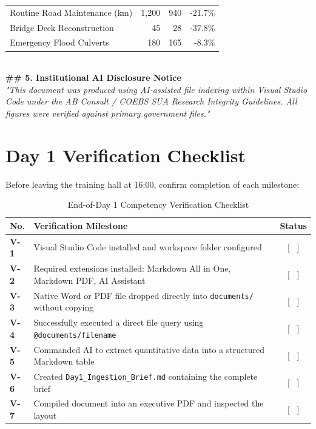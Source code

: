 \documentclass[11pt, a4paper]{report}
\begin{document}
\begin{tcolorbox}[colback=lightgrey, colframe=bordergrey, title=\textbf{Deliverable 1 Preview: \texttt{Day1\_Ingestion\_Brief.md}}]
\begin{tabular}{lrrr}
\midrule
Routine Road Maintenance (km) & 1,200 & 940 & -21.7\% \\
Bridge Deck Reconstruction & 45 & 28 & -37.8\% \\
Emergency Flood Culverts & 180 & 165 & -8.3\% \\
\bottomrule
\end{tabular}\\[0.2cm]
\textbf{\#\# 5. Institutional AI Disclosure Notice}\\
\textit{"This document was produced using AI-assisted file indexing within Visual Studio Code under the AB Consult / COEBS SUA Research Integrity Guidelines. All figures were verified against primary government files."}
\end{tcolorbox}

\section{Day 1 Verification Checklist}
Before leaving the training hall at 16:00, confirm completion of each milestone:

\begin{table}[htbp]
\centering
\caption{End-of-Day 1 Competency Verification Checklist}
\vspace{0.2cm}
\begin{tabular}{@{}>{\bfseries}p{1.2cm}p{10cm}c@{}}
\toprule
No. & Verification Milestone & Status \\
\midrule
V-1 & Visual Studio Code installed and workspace folder configured & [ \ ] \\
V-2 & Required extensions installed: Markdown All in One, Markdown PDF, AI Assistant & [ \ ] \\
V-3 & Native Word or PDF file dropped directly into \texttt{documents/} without copying & [ \ ] \\
V-4 & Successfully executed a direct file query using \texttt{@documents/filename} & [ \ ] \\
V-5 & Commanded AI to extract quantitative data into a structured Markdown table & [ \ ] \\
V-6 & Created \texttt{Day1\_Ingestion\_Brief.md} containing the complete brief & [ \ ] \\
V-7 & Compiled document into an executive PDF and inspected the layout & [ \ ] \\
\bottomrule
\end{tabular}
\end{table}

\newpage
\end{document}
